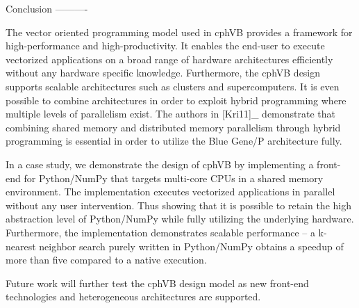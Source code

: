 
Conclusion
----------

The vector oriented programming model used in cphVB provides a framework for high-performance and high-productivity. It enables the end-user to execute vectorized applications on a broad range of hardware architectures efficiently without any hardware specific knowledge. Furthermore, the cphVB design supports scalable architectures such as clusters and supercomputers. It is even possible to combine architectures in order to exploit hybrid programming where multiple levels of parallelism exist. The authors in [Kri11]_ demonstrate that combining shared memory and distributed memory parallelism through hybrid programming is essential in order to utilize the Blue Gene/P architecture fully.

In a case study, we demonstrate the design of cphVB by implementing a front-end for Python/NumPy that targets multi-core CPUs in a shared memory environment. The implementation executes vectorized applications in parallel without any user intervention. Thus showing that it is possible to retain the high abstraction level of Python/NumPy while fully utilizing the underlying hardware. Furthermore, the implementation demonstrates scalable performance – a k-nearest neighbor search purely written in Python/NumPy obtains a speedup of more than five compared to a native execution.

Future work will further test the cphVB design model as new front-end technologies and heterogeneous architectures are supported. 
